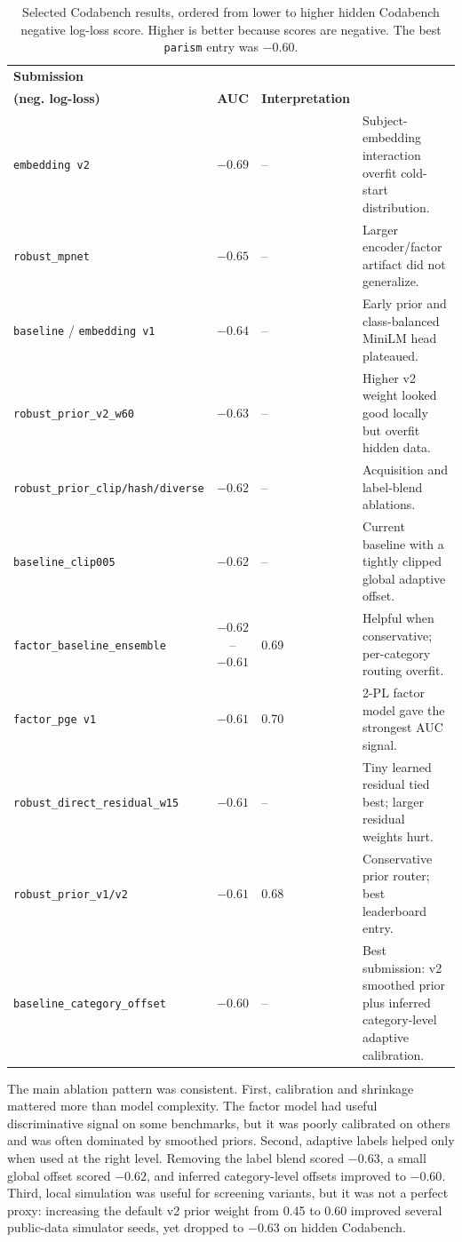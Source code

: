 \documentclass{article}
\begin{document}
\begin{table}[H]
\centering
\footnotesize
\begin{tabularx}{\textwidth}{@{}lclX@{}}
\toprule
\textbf{Submission} & \shortstack{\textbf{Score}\\\textbf{(neg. log-loss)}} & \textbf{AUC} & \textbf{Interpretation} \\
\midrule
\texttt{embedding v2} & $-0.69$ & -- & Subject-embedding interaction overfit cold-start distribution. \\
\texttt{robust\_mpnet} & $-0.65$ & -- & Larger encoder/factor artifact did not generalize. \\
\texttt{baseline} / \texttt{embedding v1} & $-0.64$ & -- & Early prior and class-balanced MiniLM head plateaued. \\
\texttt{robust\_prior\_v2\_w60} & $-0.63$ & -- & Higher v2 weight looked good locally but overfit hidden data. \\
\texttt{robust\_prior\_clip/hash/diverse} & $-0.62$ & -- & Acquisition and label-blend ablations. \\
\texttt{baseline\_clip005} & $-0.62$ & -- & Current baseline with a tightly clipped global adaptive offset. \\
\texttt{factor\_baseline\_ensemble} & $-0.62$--$-0.61$ & 0.69 & Helpful when conservative; per-category routing overfit. \\
\texttt{factor\_pge v1} & $-0.61$ & 0.70 & 2-PL factor model gave the strongest AUC signal. \\
\texttt{robust\_direct\_residual\_w15} & $-0.61$ & -- & Tiny learned residual tied best; larger residual weights hurt. \\
\texttt{robust\_prior\_v1/v2} & $-0.61$ & 0.68 & Conservative prior router; best leaderboard entry. \\
\texttt{baseline\_category\_offset} & $-0.60$ & -- & Best submission: v2 smoothed prior plus inferred category-level adaptive calibration. \\
\bottomrule
\end{tabularx}
\caption{Selected Codabench results, ordered from lower to higher hidden Codabench negative log-loss score. Higher is better because scores are negative. The best \texttt{parism} entry was $-0.60$.}
\label{tab:history}
\end{table}

The main ablation pattern was consistent. First, calibration and shrinkage mattered more than model complexity. The factor model had useful discriminative signal on some benchmarks, but it was poorly calibrated on others and was often dominated by smoothed priors. Second, adaptive labels helped only when used at the right level. Removing the label blend scored $-0.63$, a small global offset scored $-0.62$, and inferred category-level offsets improved to $-0.60$. Third, local simulation was useful for screening variants, but it was not a perfect proxy: increasing the default v2 prior weight from 0.45 to 0.60 improved several public-data simulator seeds, yet dropped to $-0.63$ on hidden Codabench.
\end{document}
